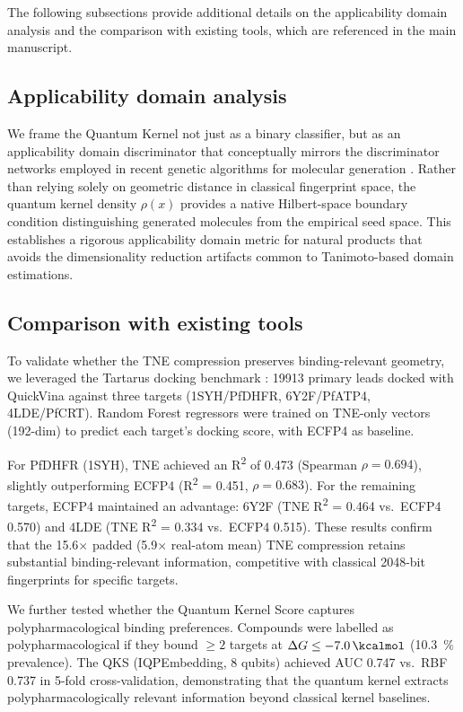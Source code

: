 \documentclass[11pt,a4paper]{article}
\begin{document}
The following subsections provide additional details on the applicability domain analysis and the comparison with existing tools, which are referenced in the main manuscript.

\subsection{Applicability domain analysis}
\label{sec:applicability_domain}

We frame the Quantum Kernel not just as a binary classifier, but as an applicability domain discriminator that conceptually mirrors the discriminator networks employed in recent genetic algorithms for molecular generation \citep{jensen2019augmenting}. Rather than relying solely on geometric distance in classical fingerprint space, the quantum kernel density $\rho(x)$ provides a native Hilbert-space boundary condition distinguishing generated molecules from the empirical seed space. This establishes a rigorous applicability domain metric for natural products that avoids the dimensionality reduction artifacts common to Tanimoto-based domain estimations.


\subsection{Comparison with existing tools}


To validate whether the TNE compression preserves binding-relevant geometry, we leveraged the Tartarus docking benchmark \citep{tartarus_2024}: \num{19913} primary leads docked with QuickVina against three targets (1SYH/PfDHFR, 6Y2F/PfATP4, 4LDE/PfCRT). Random Forest regressors were trained on TNE-only vectors (\num{192}-dim) to predict each target's docking score, with ECFP4 as baseline.

For PfDHFR (1SYH), TNE achieved an R\textsuperscript{2} of \num{0.473} (Spearman $\rho = \num{0.694}$), slightly outperforming ECFP4 (R\textsuperscript{2} = \num{0.451}, $\rho = \num{0.683}$). For the remaining targets, ECFP4 maintained an advantage: 6Y2F (TNE R\textsuperscript{2} = \num{0.464} vs.\ ECFP4 \num{0.570}) and 4LDE (TNE R\textsuperscript{2} = \num{0.334} vs.\ ECFP4 \num{0.515}). These results confirm that the \num{15.6}$\times$ padded (\num{5.9}$\times$ real-atom mean) TNE compression retains substantial binding-relevant information, competitive with classical \num{2048}-bit fingerprints for specific targets.

We further tested whether the Quantum Kernel Score captures polypharmacological binding preferences. Compounds were labelled as polypharmacological if they bound $\geq 2$ targets at $\Delta G \leq -\SI{7.0}{\kcalmol}$ (\qty{10.3}{\percent} prevalence). The QKS (IQPEmbedding, 8 qubits) achieved AUC \num{0.747} vs.\ RBF \num{0.737} in \num{5}-fold cross-validation, demonstrating that the quantum kernel extracts polypharmacologically relevant information beyond classical kernel baselines.
\end{document}
